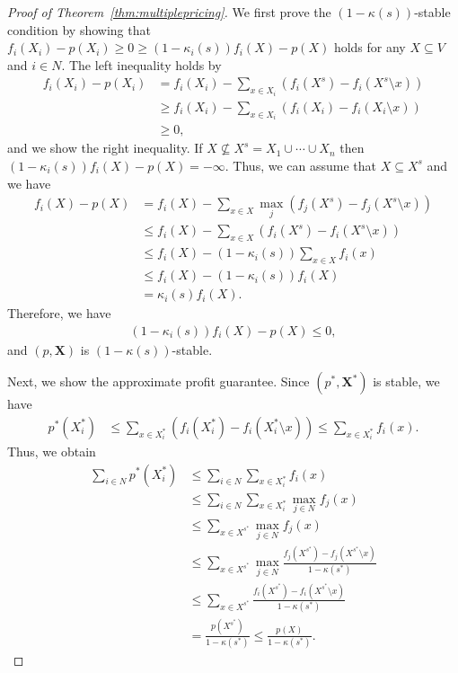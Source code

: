 \documentclass[letterpaper]{article}
\theoremstyle{definition}
\begin{document}
\begin{proof}[Proof of Theorem~\ref{thm:multiplepricing}]
  We first prove the $(1-\kappa(s))$-stable condition
  by showing that \(f_i(X_i)-p(X_i)\ge 0\ge (1-\kappa_i(s))f_i(X)-p(X)\) holds for any \(X\subseteq V\) and \(i\in N\).
  The left inequality holds by
\begin{align}
  f_i(X_i) - p(X_i) 
  &= f_i(X_i) - \sum_{x \in X_i} (f_i(X^s) - f_i(X^s \setminus x)) \nonumber \\
  &\ge f_i(X_i) - \sum_{x \in X_i} (f_i(X_i) - f_i(X_i \setminus x)) \nonumber \\
  &\ge 0,
\end{align}
and we show the right inequality.
If $X \not \subseteq X^s = X_1 \cup \cdots \cup X_n$ then $(1-\kappa_i(s))f_i(X) - p(X) = -\infty$.
Thus, we can assume that \(X\subseteq X^s\) and we have
\begin{align}
  f_i(X) - p(X) 
  &= f_i(X) - \sum_{x \in X} \max_j (f_j(X^s) - f_j(X^s \setminus x)) \nonumber \\
  &\le f_i(X) - \sum_{x \in X} (f_i(X^s) - f_i(X^s \setminus x)) \nonumber \\
  &\le f_i(X) - (1 - \kappa_i(s)) \sum_{x \in X} f_i(x) \nonumber \\
  &\le f_i(X) - (1 - \kappa_i(s)) f_i(X) \nonumber \\
  &= \kappa_i(s) f_i(X).
\end{align}
Therefore, we have
\begin{align}
  \left(1 - \kappa_i(s)\right) f_i(X) - p(X) \le 0,
\end{align}
and \((p,\mathbf{X})\) is $(1-\kappa(s))$-stable.

Next, we show the approximate profit guarantee.
Since \((p^*,\mathbf{X}^*)\) is stable,
we have
\begin{align}
  p^*(X_i^*) 
  &\le 
  \sum_{x \in X_i^*} (f_i(X_i^*) - f_i(X_i^* \setminus x))
  \le \sum_{x \in X_i^*} f_i(x).
\end{align}
Thus, we obtain
\begin{align}
  \sum_{i\in N} p^*(X_i^*)
  &\le \sum_{i\in N} \sum_{x \in X_i^*} f_i(x) \nonumber \\
  &\le \sum_{i\in N} \sum_{x \in X_i^*} \max_{j\in N} f_j(x) \nonumber \\
  &\le \sum_{x \in X^{s^*}} \max_{j\in N} f_j(x) \nonumber \\
  &\le \sum_{x \in X^{s^*}} \max_{j\in N} \frac{f_j(X^{s^*})-f_j(X^{s^*}\setminus x)}{1-\kappa(s^*)} \nonumber \\
  &\le \sum_{x \in X^{s^*}} \frac{f_i(X^{s^*})-f_i(X^{s^*}\setminus x)}{1-\kappa(s^*)} \nonumber \\
  &= \frac{p(X^{s^*})}{1-\kappa(s^*)} \le \frac{p(X)}{1-\kappa(s^*)}.
\end{align}
\end{proof}
\end{document}
